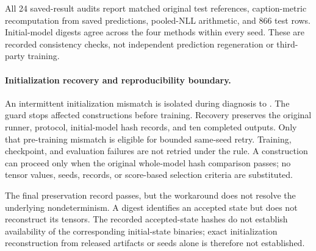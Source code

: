 All 24 saved-result audits report matched original test
references, caption-metric recomputation from saved predictions,
pooled-NLL arithmetic, and 866 test rows.
Initial-model digests agree across the four methods within
every seed. These are recorded consistency checks, not
independent prediction regeneration or third-party training.

\paragraph{Initialization recovery and reproducibility boundary.}
An intermittent initialization mismatch is isolated during
diagnosis to .
The guard stops affected constructions before training.
Recovery preserves the original runner, protocol, initial-model
hash records, and ten completed outputs.
Only that pre-training mismatch is eligible for bounded
same-seed retry. Training, checkpoint, and evaluation failures
are not retried under the rule.
A construction can proceed only when the original whole-model
hash comparison passes; no tensor values, seeds, records,
or score-based selection criteria are substituted.

The final preservation record passes, but the workaround does not resolve
the underlying nondeterminism. A digest identifies an accepted state but
does not reconstruct its tensors. The recorded accepted-state hashes do
not establish availability of the corresponding initial-state binaries;
exact initialization reconstruction from released artifacts or seeds
alone is therefore not established.


